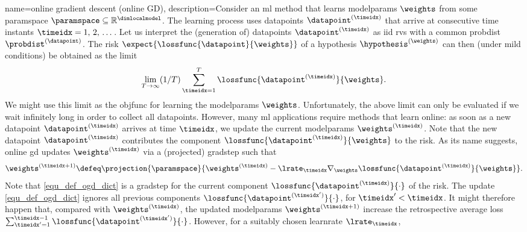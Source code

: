 {name={online gradient descent (online GD)}, 
	description={Consider  an \gls{ml} 
	             method that learns \glspl{modelparam} $\weights$ from some 
				 \gls{paramspace} $\paramspace \subseteq \mathbb{R}^{\dimlocalmodel}$. 
		         The learning process uses \glspl{datapoint} $\datapoint^{(\timeidx)}$ 
				 that arrive at consecutive time instants $\timeidx=1, \,2, \,\dots$. 
				 Let us interpret the (generation of) \glspl{datapoint} $\datapoint^{(\timeidx)}$ 
				 as \gls{iid} \glspl{rv} with a common \gls{probdist} $\probdist^{(\datapoint)}$. 
				 The \gls{risk} $\expect\{ \lossfunc{\datapoint}{\weights} \}$ of a 
				\gls{hypothesis} $\hypothesis^{(\weights)}$ can then (under mild conditions) 
				be obtained as the limit 
		$$\lim_{T\rightarrow \infty} (1/T)\sum_{\timeidx=1}^{T} \lossfunc{\datapoint^{(\timeidx)}}{\weights}.$$ 
				We might use this limit as the \gls{objfunc} for learning the 
				\glspl{modelparam} $\weights$. Unfortunately, the above limit can 
				only be evaluated if we wait infinitely long in order to collect all \glspl{datapoint}. 
				However, many \gls{ml} applications require methods that learn online: 
				as soon as a new \gls{datapoint} $\datapoint^{(\timeidx)}$ arrives at 
				time $\timeidx$, we update the current \glspl{modelparam} $\weights^{(\timeidx)}$. 
				Note that the new \gls{datapoint} $\datapoint^{(\timeidx)}$ contributes 
				the component $\lossfunc{\datapoint^{(\timeidx)}}{\weights}$ to the \gls{risk}. 
				As its name suggests, online \gls{gd} updates $\weights^{(\timeidx)}$ via 
				a (projected) \gls{gradstep} such that
		\begin{equation} 
			\label{equ_def_ogd_dict}
 			\weights^{(\timeidx+1)} \defeq \projection{\paramspace}{\weights^{(\timeidx)} - \lrate_{\timeidx} \nabla_{\weights} \lossfunc{\datapoint^{(\timeidx)}}{\weights}}. 
		\end{equation} 
		Note that \eqref{equ_def_ogd_dict} is a \gls{gradstep} for the 
		current component $\lossfunc{\datapoint^{(\timeidx)}}{\cdot}$ 
		of the \gls{risk}. The update \eqref{equ_def_ogd_dict} ignores all 
		previous components $\lossfunc{\datapoint^{(\timeidx')}}{\cdot}$, 
		for $\timeidx' < \timeidx$. It might therefore happen that, compared 
		with $\weights^{(\timeidx)}$, the updated \glspl{modelparam} 
		$\weights^{(\timeidx+1)}$ increase the retrospective average 
		\gls{loss} $\sum_{\timeidx'=1}^{\timeidx-1} \lossfunc{\datapoint^{(\timeidx')}}{\cdot}$. 
		However, for a suitably chosen \gls{learnrate} $\lrate_{\timeidx}$, 
}}
